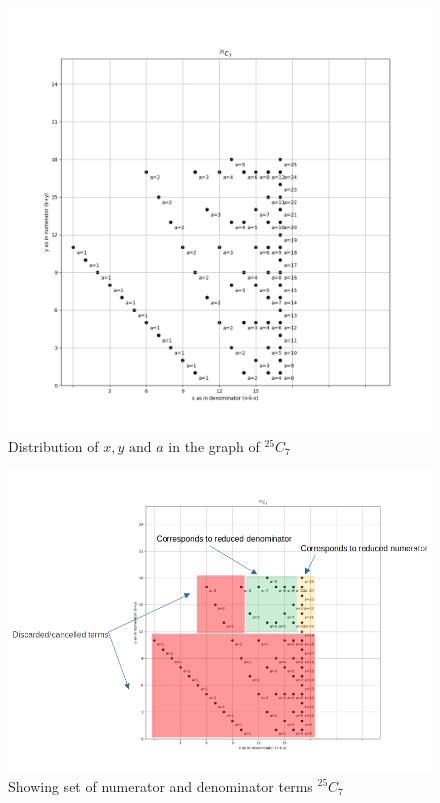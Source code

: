 \documentclass[10pt, twoside]{article}
\newcommand*{\Combination}[2]{{}^{#1}C_{#2}}%
\begin{document}
\begin{appendices}
\begin{figure}[ph!]
\end{figure}
\begin{figure}[ph!]
\includegraphics[width=\linewidth]{25_7_alone.png}
\caption{Distribution of $x,y \text{ and } a$ in the graph of $\Combination{25}{7}$}
\label{25_C_7_example}
\end{figure}
\begin{figure}[ph!]
\includegraphics[width=\linewidth]{CalculationOfCombination.png}
\caption{Showing set of numerator and denominator terms $\Combination{25}{7}$}

\end{figure}
\end{appendices}
\end{document}
